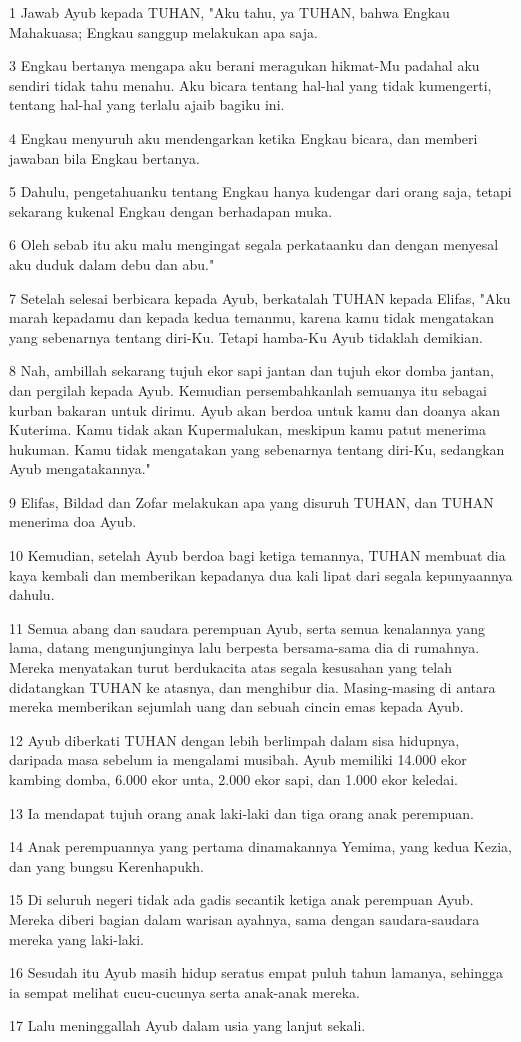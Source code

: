 \par 1 Jawab Ayub kepada TUHAN, "Aku tahu, ya TUHAN, bahwa Engkau Mahakuasa; Engkau sanggup melakukan apa saja.
\par 3 Engkau bertanya mengapa aku berani meragukan hikmat-Mu padahal aku sendiri tidak tahu menahu. Aku bicara tentang hal-hal yang tidak kumengerti, tentang hal-hal yang terlalu ajaib bagiku ini.
\par 4 Engkau menyuruh aku mendengarkan ketika Engkau bicara, dan memberi jawaban bila Engkau bertanya.
\par 5 Dahulu, pengetahuanku tentang Engkau hanya kudengar dari orang saja, tetapi sekarang kukenal Engkau dengan berhadapan muka.
\par 6 Oleh sebab itu aku malu mengingat segala perkataanku dan dengan menyesal aku duduk dalam debu dan abu."
\par 7 Setelah selesai berbicara kepada Ayub, berkatalah TUHAN kepada Elifas, "Aku marah kepadamu dan kepada kedua temanmu, karena kamu tidak mengatakan yang sebenarnya tentang diri-Ku. Tetapi hamba-Ku Ayub tidaklah demikian.
\par 8 Nah, ambillah sekarang tujuh ekor sapi jantan dan tujuh ekor domba jantan, dan pergilah kepada Ayub. Kemudian persembahkanlah semuanya itu sebagai kurban bakaran untuk dirimu. Ayub akan berdoa untuk kamu dan doanya akan Kuterima. Kamu tidak akan Kupermalukan, meskipun kamu patut menerima hukuman. Kamu tidak mengatakan yang sebenarnya tentang diri-Ku, sedangkan Ayub mengatakannya."
\par 9 Elifas, Bildad dan Zofar melakukan apa yang disuruh TUHAN, dan TUHAN menerima doa Ayub.
\par 10 Kemudian, setelah Ayub berdoa bagi ketiga temannya, TUHAN membuat dia kaya kembali dan memberikan kepadanya dua kali lipat dari segala kepunyaannya dahulu.
\par 11 Semua abang dan saudara perempuan Ayub, serta semua kenalannya yang lama, datang mengunjunginya lalu berpesta bersama-sama dia di rumahnya. Mereka menyatakan turut berdukacita atas segala kesusahan yang telah didatangkan TUHAN ke atasnya, dan menghibur dia. Masing-masing di antara mereka memberikan sejumlah uang dan sebuah cincin emas kepada Ayub.
\par 12 Ayub diberkati TUHAN dengan lebih berlimpah dalam sisa hidupnya, daripada masa sebelum ia mengalami musibah. Ayub memiliki 14.000 ekor kambing domba, 6.000 ekor unta, 2.000 ekor sapi, dan 1.000 ekor keledai.
\par 13 Ia mendapat tujuh orang anak laki-laki dan tiga orang anak perempuan.
\par 14 Anak perempuannya yang pertama dinamakannya Yemima, yang kedua Kezia, dan yang bungsu Kerenhapukh.
\par 15 Di seluruh negeri tidak ada gadis secantik ketiga anak perempuan Ayub. Mereka diberi bagian dalam warisan ayahnya, sama dengan saudara-saudara mereka yang laki-laki.
\par 16 Sesudah itu Ayub masih hidup seratus empat puluh tahun lamanya, sehingga ia sempat melihat cucu-cucunya serta anak-anak mereka.
\par 17 Lalu meninggallah Ayub dalam usia yang lanjut sekali.


